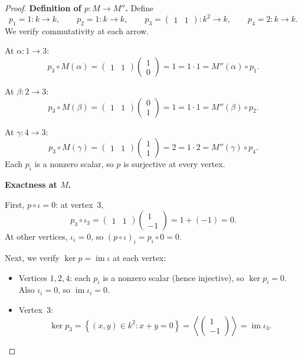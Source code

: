 \documentclass[11pt, a4paper]{article}
\begin{document}
\begin{enumerate}[leftmargin=*, label=\textbf{\arabic*.}]
\begin{enumerate}[label=(\alph*)]
\begin{proof}
    \medskip\noindent\textbf{Definition of $p\colon M\to M''$.}
    Define
    \[
    p_1 = 1\colon k\to k,\qquad p_2 = 1\colon k\to k,\qquad p_3 = \begin{pmatrix}1&1\end{pmatrix}\colon k^2\to k,\qquad p_4 = 2\colon k\to k.
    \]
    We verify commutativity at each arrow.
    
    At $\alpha\colon 1\to 3$:
    \[
    p_3\circ M(\alpha) = \begin{pmatrix}1&1\end{pmatrix}\begin{pmatrix}1\\0\end{pmatrix} = 1 = 1\cdot 1 = M''(\alpha)\circ p_1.
    \]
    
    At $\beta\colon 2\to 3$:
    \[
    p_3\circ M(\beta) = \begin{pmatrix}1&1\end{pmatrix}\begin{pmatrix}0\\1\end{pmatrix} = 1 = 1\cdot 1 = M''(\beta)\circ p_2.
    \]
    
    At $\gamma\colon 4\to 3$:
    \[
    p_3\circ M(\gamma) = \begin{pmatrix}1&1\end{pmatrix}\begin{pmatrix}1\\1\end{pmatrix} = 2 = 1\cdot 2 = M''(\gamma)\circ p_4.
    \]
    Each $p_i$ is a nonzero scalar, so $p$ is surjective at every vertex.
    
    \medskip\noindent\textbf{Exactness at $M$.}
    
    First, $p\circ\iota = 0$: at vertex~$3$,
    \[
    p_3\circ\iota_3 = \begin{pmatrix}1&1\end{pmatrix}\begin{pmatrix}1\\-1\end{pmatrix} = 1+(-1) = 0.
    \]
    At other vertices, $\iota_i = 0$, so $(p\circ\iota)_i = p_i\circ 0 = 0$.
    
    Next, we verify $\ker p = \operatorname{im}\iota$ at each vertex:
    \begin{itemize}
    \item Vertices $1,2,4$: each $p_i$ is a nonzero scalar (hence injective), so $\ker p_i = 0$. Also $\iota_i = 0$, so $\operatorname{im}\iota_i = 0$.
    \item Vertex~$3$:
    \[
    \ker p_3 = \left\{(x,y)\in k^2 : x+y = 0\right\} = \left\langle\begin{pmatrix}1\\-1\end{pmatrix}\right\rangle = \operatorname{im}\iota_3.
    \]
    \end{itemize}
    

\end{proof}
\end{enumerate}
\end{enumerate}
\end{document}
